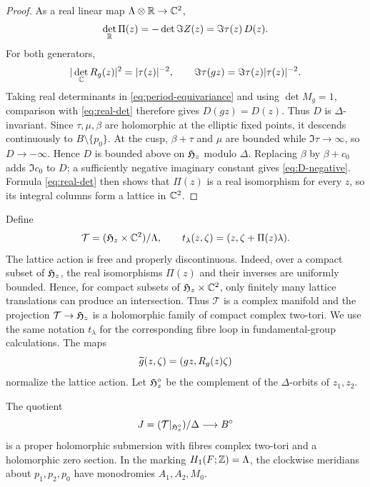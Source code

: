 \begin{proof}
As a real linear map $\Lambda\otimes\mathbb R\to\mathbb C^2$,
\begin{equation}\label{eq:real-det}
 \det_{\mathbb R}\Pi(z)=-\det\Im Z(z)=\Im\tau(z)\,D(z).
\end{equation}
For both generators,
\[
 |\det_{\mathbb C}R_g(z)|^2=|\tau(z)|^{-2},
 \qquad
 \Im\tau(gz)=\Im\tau(z)|\tau(z)|^{-2}.
\]
Taking real determinants in \eqref{eq:period-equivariance} and using
$\det M_g=1$, comparison with \eqref{eq:real-det} therefore gives
$D(gz)=D(z)$.  Thus $D$ is $\Delta$-invariant.  Since $\tau,\mu,\beta$ are holomorphic at the
elliptic fixed points, it descends continuously to
$B\setminus\{p_0\}$.  At the cusp, $\beta+\tau$ and $\mu$ are bounded
while $\Im\tau\to\infty$, so $D\to-\infty$.  Hence $D$ is bounded
above on $\mathfrak H_z$ modulo $\Delta$.  Replacing $\beta$ by
$\beta+c_0$ adds $\Im c_0$ to $D$; a sufficiently negative imaginary
constant gives \eqref{eq:D-negative}.  Formula \eqref{eq:real-det} then
shows that $\Pi(z)$ is a real isomorphism for every $z$, so its integral
columns form a lattice in $\mathbb C^2$.
\end{proof}

Define
\[
 \mathcal T=(\mathfrak H_z\times\mathbb C^2)/\Lambda,
 \qquad
 t_\lambda(z,\zeta)=(z,\zeta+\Pi(z)\lambda).
\]
The lattice action is free and properly discontinuous.  Indeed, over a
compact subset of $\mathfrak H_z$, the real isomorphisms $\Pi(z)$ and their
inverses are uniformly bounded.  Hence, for compact subsets of
$\mathfrak H_z\times\mathbb C^2$, only finitely many lattice translations can produce
an intersection.  Thus $\mathcal T$ is a complex manifold and the
projection $\mathcal T\to\mathfrak H_z$ is a holomorphic family of compact
complex two-tori.  We use the same notation $t_\lambda$ for the
corresponding fibre loop in fundamental-group calculations.  The maps
\[
 \widetilde g(z,\zeta)=(gz,R_g(z)\zeta)
\]
normalize the lattice action.  Let
$\mathfrak H_z^\circ$ be the complement of the $\Delta$-orbits of $z_1,z_2$.

\begin{corollary}\label{cor:smooth-family}
The quotient
\[
 J=(\mathcal T|_{\mathfrak H_z^\circ})/\Delta
 \longrightarrow B^\circ
\]
is a proper holomorphic submersion with fibres complex two-tori and a
holomorphic zero section.  In the marking $H_1(F;\mathbb Z)=\Lambda$, the
clockwise meridians about $p_1,p_2,p_0$ have monodromies
$A_1,A_2,M_0$.
\end{corollary}

